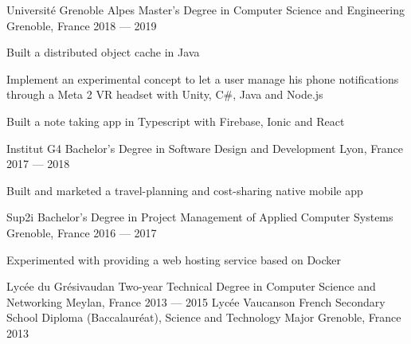 

\begin{cventries}

  \cventry
    {Université Grenoble Alpes} %
    {Master's Degree in Computer Science and Engineering} %
    {Grenoble, France} %
    {2018 — 2019} %
    {
      \begin{cvitems} %
        \item {Built a distributed object cache in Java}
        \item {Implement an experimental concept to let a user manage his phone notifications through a Meta 2 VR headset with Unity, C#, Java and Node.js}
        \item {Built a note taking app in Typescript with Firebase, Ionic and React}
      \end{cvitems}
    }
  \cventry
    {Institut G4} %
    {Bachelor's Degree in Software Design and Development} %
    {Lyon, France} %
    {2017 — 2018} %
    {
      \begin{cvitems} %
        \item {Built and marketed a travel-planning and cost-sharing native mobile app}
      \end{cvitems}
    }
  \cventry
    {Sup2i} %
    {Bachelor's Degree in Project Management of Applied Computer Systems} %
    {Grenoble, France} %
    {2016 — 2017} %
    {
      \begin{cvitems} %
        \item {Experimented with providing a web hosting service based on Docker}
      \end{cvitems}
    }
  \cventryy
    {Lycée du Grésivaudan} %
    {Two-year Technical Degree in Computer Science and Networking} %
    {Meylan, France} %
    {2013 — 2015} %
  \cventryy
    {Lycée Vaucanson} %
    {French Secondary School Diploma (Baccalauréat), Science and Technology Major} %
    {Grenoble, France} %
    {2013} %
\end{cventries}
